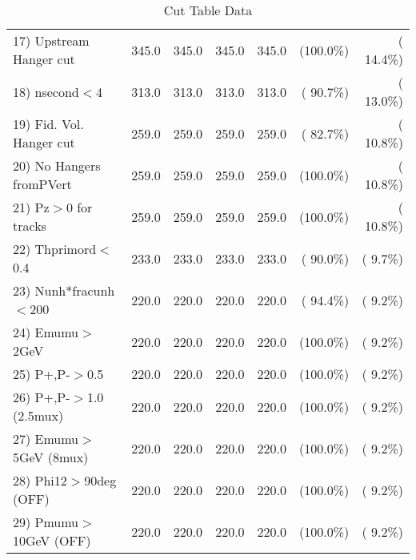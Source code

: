 \begin{table}[h!]
\begin{tabular}{||l||r|r|r|r|r|r||}
 17) Upstream Hanger cut  &        345.0 &        345.0 &        345.0 &        345.0 & (100.0\%) & ( 14.4\%) \\
 18) nsecond$<$4          &        313.0 &        313.0 &        313.0 &        313.0 & ( 90.7\%) & ( 13.0\%) \\
 19) Fid. Vol. Hanger cut &        259.0 &        259.0 &        259.0 &        259.0 & ( 82.7\%) & ( 10.8\%) \\
 20) No Hangers fromPVert &        259.0 &        259.0 &        259.0 &        259.0 & (100.0\%) & ( 10.8\%) \\
 21) Pz$>$0 for tracks    &        259.0 &        259.0 &        259.0 &        259.0 & (100.0\%) & ( 10.8\%) \\
 22) Thprimord$<$0.4      &        233.0 &        233.0 &        233.0 &        233.0 & ( 90.0\%) & (  9.7\%) \\
 23) Nunh*fracunh$<$200   &        220.0 &        220.0 &        220.0 &        220.0 & ( 94.4\%) & (  9.2\%) \\
 24) Emumu$>$2GeV         &        220.0 &        220.0 &        220.0 &        220.0 & (100.0\%) & (  9.2\%) \\
 25) P+,P-$>$0.5          &        220.0 &        220.0 &        220.0 &        220.0 & (100.0\%) & (  9.2\%) \\
 26) P+,P-$>$1.0 (2.5mux) &        220.0 &        220.0 &        220.0 &        220.0 & (100.0\%) & (  9.2\%) \\
 27) Emumu$>$5GeV  (8mux) &        220.0 &        220.0 &        220.0 &        220.0 & (100.0\%) & (  9.2\%) \\
 28) Phi12$>$90deg  (OFF) &        220.0 &        220.0 &        220.0 &        220.0 & (100.0\%) & (  9.2\%) \\
 29) Pmumu$>$10GeV  (OFF) &        220.0 &        220.0 &        220.0 &        220.0 & (100.0\%) & (  9.2\%) \\
 \hline
 \hline
 \end{tabular}
 \caption{Cut Table  Data     }
 \label{tab-cutcohjpsi-mumu_data}
 \end{table}
